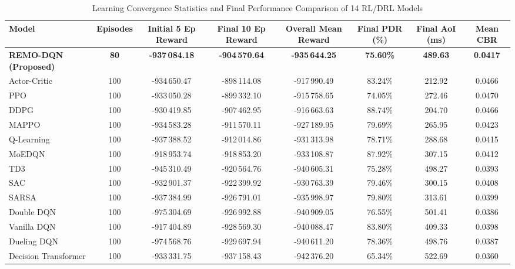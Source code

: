\documentclass[journal]{IEEEtran}
\begin{document}
\begin{table}[t]
\caption{Learning Convergence Statistics and Final Performance Comparison of 14 RL/DRL Models}
\label{tab:convergence_stats}
\centering
\scriptsize
\begin{tabularx}{\textwidth}{l c c c c c c c}
\toprule
\textbf{Model} & \textbf{Episodes} & \textbf{Initial 5 Ep Reward} & \textbf{Final 10 Ep Reward} & \textbf{Overall Mean Reward} & \textbf{Final PDR (\%)} & \textbf{Final AoI (ms)} & \textbf{Mean CBR} \\
\midrule
\textbf{REMO-DQN (Proposed)} & \textbf{80} & \textbf{-937\,084.18} & \textbf{-904\,570.64} & \textbf{-935\,644.25} & \textbf{75.60\%} & \textbf{489.63} & \textbf{0.0417} \\
Actor-Critic & 100 & -934\,650.47 & -898\,114.08 & -917\,990.49 & 83.24\% & 212.92 & 0.0466 \\
PPO & 100 & -933\,050.28 & -899\,332.10 & -915\,758.65 & 74.05\% & 272.46 & 0.0470 \\
DDPG & 100 & -930\,419.85 & -907\,462.95 & -916\,663.63 & 88.74\% & 204.70 & 0.0466 \\
MAPPO & 100 & -934\,583.28 & -911\,570.11 & -927\,189.95 & 79.69\% & 265.95 & 0.0423 \\
Q-Learning & 100 & -937\,388.52 & -912\,014.86 & -931\,313.98 & 78.71\% & 288.68 & 0.0415 \\
MoEDQN & 100 & -918\,953.74 & -918\,853.20 & -933\,108.87 & 87.92\% & 307.15 & 0.0412 \\
TD3 & 100 & -945\,310.49 & -920\,564.76 & -940\,605.31 & 75.28\% & 498.27 & 0.0393 \\
SAC & 100 & -932\,901.37 & -922\,399.92 & -930\,763.39 & 79.46\% & 300.15 & 0.0408 \\
SARSA & 100 & -937\,384.99 & -926\,791.01 & -935\,998.97 & 79.80\% & 313.61 & 0.0399 \\
Double DQN & 100 & -975\,304.69 & -926\,992.88 & -940\,909.05 & 76.55\% & 501.41 & 0.0386 \\
Vanilla DQN & 100 & -917\,404.89 & -928\,569.30 & -940\,088.47 & 83.80\% & 409.33 & 0.0398 \\
Dueling DQN & 100 & -974\,568.76 & -929\,697.94 & -940\,611.20 & 78.36\% & 498.76 & 0.0387 \\
Decision Transformer & 100 & -933\,331.75 & -937\,158.43 & -942\,376.20 & 65.34\% & 522.69 & 0.0360 \\
\bottomrule
\end{tabularx}
\end{table}
\end{document}
